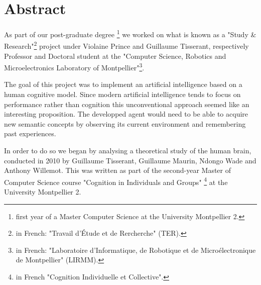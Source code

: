 \chapter*{Abstract}

As part of our post-graduate degree \footnote{first year of a Master Computer Science at the University Montpellier 2.} we worked on what is known as a "Study \& Research"\footnote{in French: "Travail d'Étude et de Rercherche" (TER).} project under \mbox{Violaine} \mbox{Prince} and \mbox{Guillaume} \mbox{Tisserant}, respectively Professor and Doctoral student at the "Computer Science, Robotics and Microelectronics Laboratory of Montpellier"\footnote{in French: "Laboratoire d'Informatique, de Robotique et de Microélectronique de Montpellier" (LIRMM).}. 

The goal of this project was to implement an artificial intelligence based on a human cognitive model. Since modern artificial intelligence tends to focus on performance rather than cognition this unconventional approach seemed like an interesting proposition. 
The developped agent would need to be able to acquire new semantic concepts by observing its current environment and remembering past experiences. 

In order to do so we began by analysing a theoretical study of the human brain, conducted in 2010 by \mbox{Guillaume} \mbox{Tisserant}, \mbox{Guillaume} \mbox{Maurin}, \mbox{Ndongo} \mbox{Wade} and \mbox{Anthony} \mbox{Willemot}. This was written as part of the second-year Master of Computer Science course "Cognition in Individuals and Groups" \footnote{in French "Cognition Individuelle et Collective".} at the University Montpellier 2.
